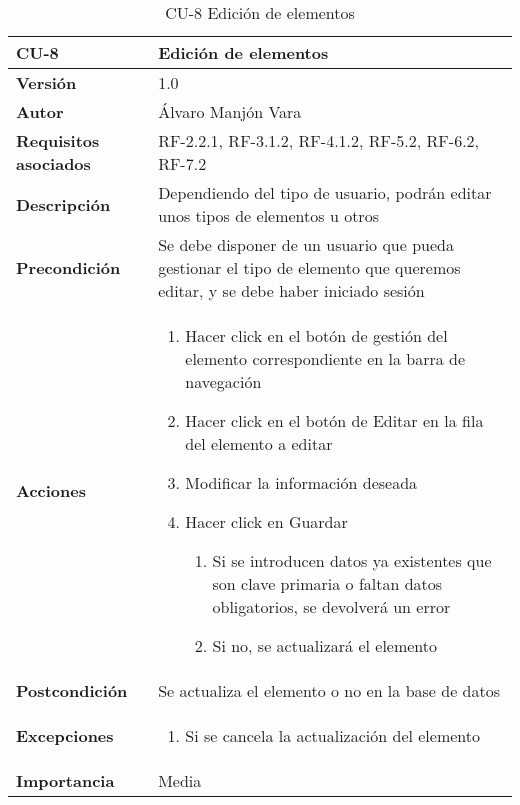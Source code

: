 \begin{table}[htp]
	\centering
	\begin{tabularx}{\linewidth}{ p{} p{} }
		\toprule
		\textbf{CU-8}    & \textbf{Edición de elementos}\\
		\toprule
		\textbf{Versión}              & 1.0    \\
		\textbf{Autor}                & Álvaro Manjón Vara \\
		\textbf{Requisitos asociados} & RF-2.2.1, RF-3.1.2, RF-4.1.2, RF-5.2, RF-6.2, RF-7.2 \\
		\textbf{Descripción}          & Dependiendo del tipo de usuario, podrán editar unos tipos de elementos u otros \\
		\textbf{Precondición}         & Se debe disponer de un usuario que pueda gestionar el tipo de elemento que queremos editar, y se debe haber iniciado sesión \\
		\textbf{Acciones}             &
		\begin{enumerate}
			\def\labelenumi{\arabic{enumi}.}
			\tightlist
			\item Hacer click en el botón de gestión del elemento correspondiente en la barra de navegación
			\item Hacer click en el botón de Editar en la fila del elemento a editar
			\item Modificar la información deseada
			\item Hacer click en Guardar
			\begin{enumerate}
				\item Si se introducen datos ya existentes que son clave primaria o faltan datos obligatorios, se devolverá un error
				\item Si no, se actualizará el elemento
			\end{enumerate}
		\end{enumerate}\\
		\textbf{Postcondición}        & Se actualiza el elemento o no en la base de datos \\
		\textbf{Excepciones}          & \begin{enumerate}
  \item Si se cancela la actualización del elemento
\end{enumerate}
 \\
		\textbf{Importancia}          & Media \\
		\bottomrule
	\end{tabularx}
	\caption{CU-8 Edición de elementos}
\end{table}
\afterpage{\clearpage}
	
